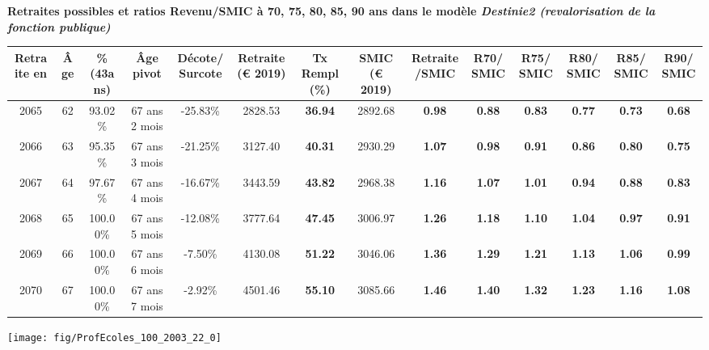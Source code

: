  \vspace{0.1cm} 
{\bf \noindent Retraites possibles et ratios Revenu/SMIC à 70, 75, 80, 85, 90 ans dans le modèle \emph{Destinie2 (revalorisation de la fonction publique)}}  
 
\begin{adjustbox}{max width=\textwidth} 
\begin{tabular}[htb]{|c|c||c|c|c||c|c||c|c||c|c|c|c|c|} 
\hline 
 Retraite en &  Âge &  \%(43ans) &  Âge pivot &  Décote/Surcote &  Retraite (\euro{} 2019) &  Tx Rempl(\%) &  SMIC (\euro{} 2019) &  Retraite/SMIC &  R70/SMIC &  R75/SMIC &  R80/SMIC &  R85/SMIC &  R90/SMIC \\ 
\hline \hline 
 2065 &  62 &  93.02\% &  67 ans 2 mois &  -25.83\% &  2828.53 &  {\bf 36.94} &  2892.68 &  {\bf {\color{red} 0.98}} &  {\bf {\color{red} 0.88}} &  {\bf {\color{red} 0.83}} &  {\bf {\color{red} 0.77}} &  {\bf {\color{red} 0.73}} &  {\bf {\color{red} 0.68}} \\ 
\hline 
 2066 &  63 &  95.35\% &  67 ans 3 mois &  -21.25\% &  3127.40 &  {\bf 40.31} &  2930.29 &  {\bf 1.07} &  {\bf {\color{red} 0.98}} &  {\bf {\color{red} 0.91}} &  {\bf {\color{red} 0.86}} &  {\bf {\color{red} 0.80}} &  {\bf {\color{red} 0.75}} \\ 
\hline 
 2067 &  64 &  97.67\% &  67 ans 4 mois &  -16.67\% &  3443.59 &  {\bf 43.82} &  2968.38 &  {\bf 1.16} &  {\bf 1.07} &  {\bf 1.01} &  {\bf {\color{red} 0.94}} &  {\bf {\color{red} 0.88}} &  {\bf {\color{red} 0.83}} \\ 
\hline 
 2068 &  65 &  100.00\% &  67 ans 5 mois &  -12.08\% &  3777.64 &  {\bf 47.45} &  3006.97 &  {\bf 1.26} &  {\bf 1.18} &  {\bf 1.10} &  {\bf 1.04} &  {\bf {\color{red} 0.97}} &  {\bf {\color{red} 0.91}} \\ 
\hline 
 2069 &  66 &  100.00\% &  67 ans 6 mois &  -7.50\% &  4130.08 &  {\bf 51.22} &  3046.06 &  {\bf 1.36} &  {\bf 1.29} &  {\bf 1.21} &  {\bf 1.13} &  {\bf 1.06} &  {\bf {\color{red} 0.99}} \\ 
\hline 
 2070 &  67 &  100.00\% &  67 ans 7 mois &  -2.92\% &  4501.46 &  {\bf 55.10} &  3085.66 &  {\bf 1.46} &  {\bf 1.40} &  {\bf 1.32} &  {\bf 1.23} &  {\bf 1.16} &  {\bf 1.08} \\ 
\hline 
\hline 
\end{tabular} 
\end{adjustbox} 
 
 \vspace{0.1cm} 

 {\hspace{-2.2cm}\texttt{[image: fig/ProfEcoles\_100\_2003\_22\_0]}} 

